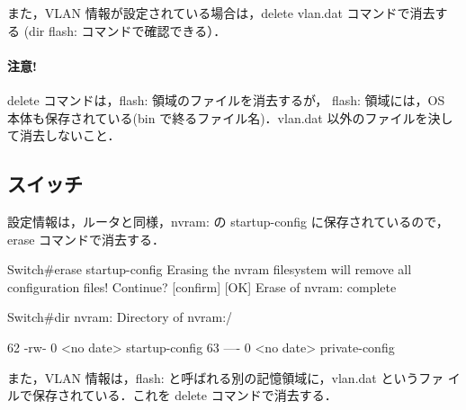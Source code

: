 
また，VLAN 情報が設定されている場合は，delete vlan.dat コマンドで消去す
る (dir flash: コマンドで確認できる）．

\paragraph{注意!} 
delete コマンドは，flash: 領域のファイルを消去するが，
flash: 領域には，OS 本体も保存されている(bin で終るファイル名)．vlan.dat 
以外のファイルを決して消去しないこと．

\subsection*{スイッチ}

設定情報は，ルータと同様，nvram: の startup-config に保存されているので，
erase コマンドで消去する．

\begin{cli}
Switch#erase startup-config
Erasing the nvram filesystem will remove all configuration files!
 Continue? [confirm]
[OK]
Erase of nvram: complete

Switch#dir nvram:
Directory of nvram:/

   62  -rw-           0                    <no date>  startup-config
   63  ----           0                    <no date>  private-config
\end{cli}

また，VLAN 情報は，flash: と呼ばれる別の記憶領域に，vlan.dat というファ
イルで保存されている．これを delete コマンドで消去する．

